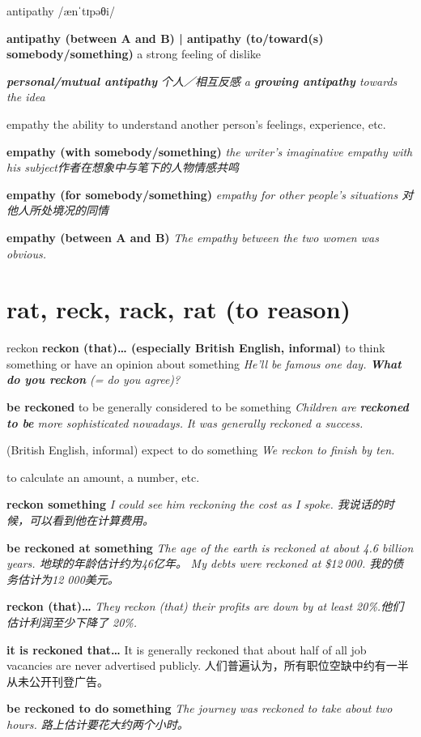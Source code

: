\begin{DefWord}{antipathy}
    /ænˈtɪpəθi/

    \textbf{antipathy (between A and B) | antipathy (to/toward(s) somebody/something)} a strong feeling of dislike

    \textit{\textbf{personal/mutual antipathy} 个人／相互反感}
    \textit{a \textbf{growing antipathy} towards the idea}
\end{DefWord}

\begin{DefWord}{empathy}
    the ability to understand another person's feelings, experience, etc.

    \textbf{empathy (with somebody/something)} 
    \textit{the writer's imaginative empathy with his subject作者在想象中与笔下的人物情感共鸣}
 
    \textbf{empathy (for somebody/something) }
    \textit{empathy for other people's situations 对他人所处境况的同情}

    \textbf{empathy (between A and B)} 
    \textit{The empathy between the two women was obvious.}
\end{DefWord}

\section{rat, reck, rack, rat (to reason)}

\begin{DefWord}{reckon}
    \textbf{reckon (that)… (especially British English, informal)} to think something or have an opinion about something
    \textit{He'll be famous one day. \textbf{What do you reckon} (= do you agree)?}

    \textbf{be reckoned} to be generally considered to be something
    \textit{Children are \textbf{reckoned to be} more sophisticated nowadays.}
    \textit{It was generally reckoned a success.}

    (British English, informal) expect to do something
    \textit{We reckon to finish by ten.}

    to calculate an amount, a number, etc.

    \textbf{reckon something} 
    \textit{I could see him reckoning the cost as I spoke. 我说话的时候，可以看到他在计算费用。}

    \textbf{be reckoned at something} \textit{The age of the earth is reckoned at about 4.6 billion years. 地球的年龄估计约为46亿年。}
    \textit{My debts were reckoned at \$12 000. 我的债务估计为12 000美元。}

    \textbf{reckon (that)…} \textit{They reckon (that) their profits are down by at least 20\%.他们估计利润至少下降了 20\%.}

    \textbf{it is reckoned that…} It is generally reckoned that about half of all job vacancies are never advertised publicly. 人们普遍认为，所有职位空缺中约有一半从未公开刊登广告。

    \textbf{be reckoned to do something} \textit{The journey was reckoned to take about two hours. 路上估计要花大约两个小时。}
\end{DefWord}

